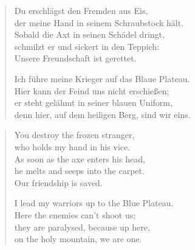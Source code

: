 \clearpage

\begin{verse}
Du erschlägst den Fremden aus Eis,\\
der meine Hand in seinem Schraubstock hält.\\
Sobald die Axt in seinen Schädel dringt,\\
schmilzt er und sickert in den Teppich:\\
Unsere Freundschaft ist gerettet.

\rhytmbreak

Ich führe meine Krieger auf das Blaue Plateau.\\
Hier kann der Feind uns nicht erschießen;\\
er steht gelähmt in seiner blauen Uniform,\\
denn hier, auf dem heiligen Berg, sind wir eins.
\end{verse}

\clearpage

\begin{verse}

You destroy the frozen stranger,\\
who holds my hand in his vice.\\
As soon as the axe enters his head,\\
he melts and seeps into the carpet.\\
Our friendship is saved.

\rhytmbreak

I lead my warriors up to the Blue Plateau.\\
Here the enemies can't shoot us;\\
they are paralysed, because up here,\\
on the holy mountain, we are one.
\end{verse}

